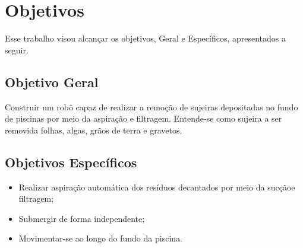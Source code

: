 \section{Objetivos}
Esse trabalho visou alcançar os objetivos, Geral e Específicos, apresentados a seguir.

\subsection{Objetivo Geral}
Construir um robô capaz de realizar a remoção de sujeiras depositadas no fundo
de piscinas por meio da aspiração e filtragem. Entende-se como sujeira a ser
removida folhas, algas, grãos de terra e gravetos.

\subsection{Objetivos Específicos}
\begin{itemize}
\item Realizar aspiração automática dos resíduos decantados por meio da sucçãoe filtragem;
\item Submergir de forma independente;
\item Movimentar-se ao longo do fundo da piscina.
\end{itemize}